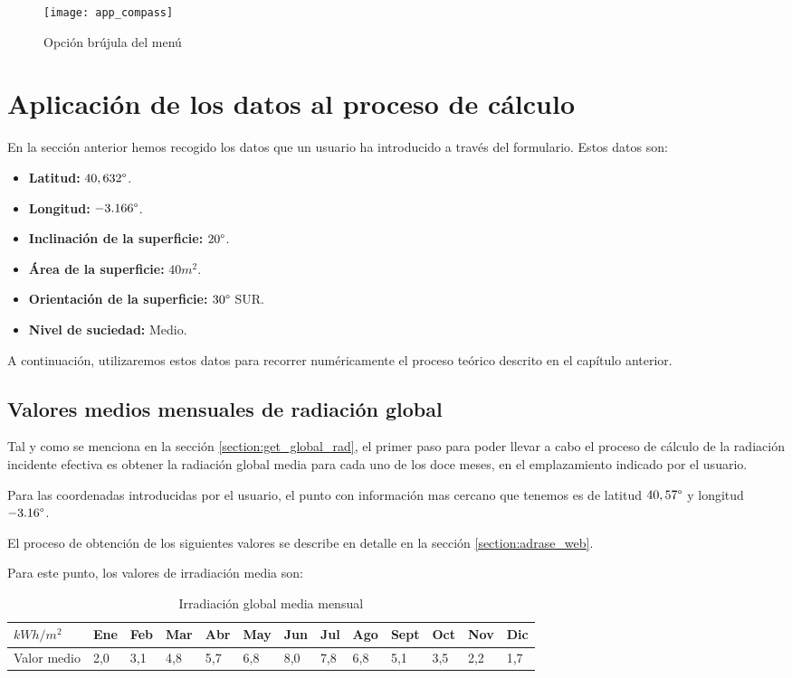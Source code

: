 \begin{figure}[H]
\texttt{[image: app\_compass]}
\centering
\caption{Opción brújula del menú}
\end{figure}

\section {Aplicación de los datos al proceso de cálculo}

En la sección anterior hemos recogido los datos que un usuario ha introducido a través del formulario. Estos datos son:
\begin{itemize}
\item \textbf{Latitud:} $40,632 \degree$.
\item \textbf{Longitud:} $-3.166 \degree$.
\item \textbf{Inclinación de la superficie:} $20 \degree$.
\item \textbf{Área de la superficie:} $40 m^2 $.
\item \textbf{Orientación de la superficie:} $30 \degree$ SUR.
\item \textbf{Nivel de suciedad:} Medio.
\end{itemize}

A continuación, utilizaremos estos datos para recorrer numéricamente el proceso teórico descrito en el capítulo anterior. 

\subsection{Valores medios mensuales de radiación global}

Tal y como se menciona en la sección \ref{section:get_global_rad}, el primer paso para poder llevar a cabo el proceso de cálculo de la radiación incidente efectiva es obtener la radiación global media para cada uno de los doce meses, en el emplazamiento indicado por el usuario.

Para las coordenadas introducidas por el usuario, el punto con información mas cercano que tenemos es de latitud  $40,57 \degree$ y longitud $-3.16 \degree$. 

El proceso de obtención de los siguientes valores se describe en detalle en la sección \ref{section:adrase_web}.

Para este punto, los valores de irradiación media son:
\begin{table}[ht]
\centering
\begin{tabular}{|l|l|l|l|l|l|l|l|l|l|l|l|l|}
\hline
$kWh/m^2$   & Ene & Feb & Mar & Abr & May & Jun & Jul & Ago & Sept & Oct & Nov & Dic \\ \hline
Valor medio & 2,0 & 3,1 & 4,8 & 5,7 & 6,8 & 8,0 & 7,8 & 6,8 & 5,1  & 3,5 & 2,2 & 1,7 \\ \hline
\end{tabular}
\label{tab:mean_values_monthly}
\caption{Irradiación global media mensual}
\end{table}

